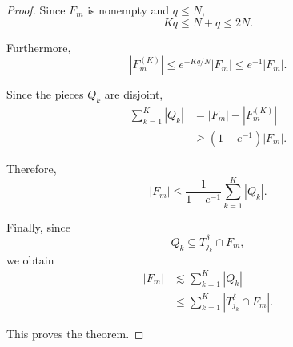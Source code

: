 \documentclass[11pt, letterpaper]{nyjm}
\begin{document}
\begin{proof}
	Since $F_m$ is nonempty and $q\leq N$,
	\[
	Kq\leq N+q\leq 2N.
	\]
	
	Furthermore,
	\[
	|F_m^{(K)}|
	\leq e^{-Kq/N}|F_m|
	\leq e^{-1}|F_m|.
	\]
	
	Since the pieces $Q_k$ are disjoint,
	\[
	\begin{aligned}
		\sum_{k=1}^K|Q_k|
		&=
		|F_m|-|F_m^{(K)}|\\
		&\geq
		(1-e^{-1})|F_m|.
	\end{aligned}
	\]
	
	Therefore,
	\[
	\boxed{
		|F_m|
		\leq
		\frac{1}{1-e^{-1}}
		\sum_{k=1}^K|Q_k|.
	}
	\]
	
	Finally, since
	\[
	Q_k\subseteq T_{j_k}^\delta\cap F_m,
	\]
	we obtain
	\[
	\begin{aligned}
		|F_m|
		&\lesssim\sum_{k=1}^K|Q_k|\\
		&\leq
		\sum_{k=1}^K
		|T_{j_k}^\delta\cap F_m|.
	\end{aligned}
	\]
	
	This proves the theorem.
\end{proof}
\end{document}
